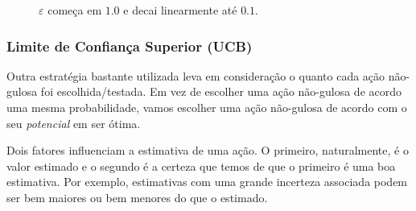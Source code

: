 \documentclass{article}
\begin{document}
\begin{itemize}
                    \begin{figure}[ht]
                        \centering
                        
                        \caption{$\varepsilon$ começa em $1.0$ e decai linearmente até $0.1$.}
                        \label{diag:epsilon-decay}
                    \end{figure}
                \end{itemize}
            
        \subsubsection{Limite de Confiança Superior (UCB)}
        
            Outra estratégia bastante utilizada leva em consideração o quanto cada ação não-gulosa foi escolhida/testada. Em vez de escolher uma ação não-gulosa de acordo uma mesma probabilidade, vamos escolher uma ação não-gulosa de acordo com o seu \emph{potencial} em ser ótima.
            
            Dois fatores influenciam a estimativa de uma ação. O primeiro, naturalmente, é o valor estimado e o segundo é a certeza que temos de que o primeiro é uma boa estimativa. Por exemplo, estimativas com uma grande incerteza associada podem ser bem maiores ou bem menores do que o estimado.
            
\end{document}
